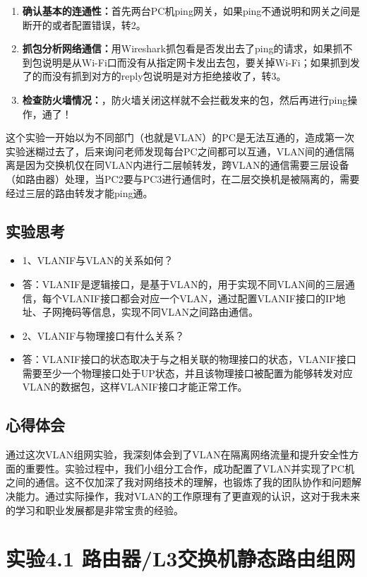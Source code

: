 \documentclass{article}
\begin{document}
\begin{enumerate}
    \item \textbf{确认基本的连通性：}首先两台PC机ping网关，如果ping不通说明和网关之间是断开的或者配置错误，转2。
    \item \textbf{抓包分析网络通信：}用Wireshark抓包看是否发出去了ping的请求，如果抓不到包说明是从Wi-Fi口而没有从指定网卡发出去包，要关掉Wi-Fi；如果抓到发了的而没有抓到对方的reply包说明是对方拒绝接收了，转3。
    \item \textbf{检查防火墙情况：}，防火墙关闭这样就不会拦截发来的包，然后再进行ping操作，通了！
\end{enumerate}

这个实验一开始以为不同部门（也就是VLAN）的PC是无法互通的，造成第一次实验迷糊过去了，后来询问老师发现每台PC之间都可以互通，VLAN间的通信隔离是因为交换机仅在同VLAN内进行二层帧转发，跨VLAN的通信需要三层设备（如路由器）处理，当PC2要与PC3进行通信时，在二层交换机是被隔离的，需要经过三层的路由转发才能ping通。

\subsection{实验思考}
\begin{itemize}
    \item 1、VLANIF与VLAN的关系如何？
    \item 答：VLANIF是逻辑接口，是基于VLAN的，用于实现不同VLAN间的三层通信，每个VLANIF接口都会对应一个VLAN，通过配置VLANIF接口的IP地址、子网掩码等信息，实现不同VLAN之间路由通信。
    \item 2、VLANIF与物理接口有什么关系？
    \item 答：VLANIF接口的状态取决于与之相关联的物理接口的状态，VLANIF接口需要至少一个物理接口处于UP状态，并且该物理接口被配置为能够转发对应VLAN的数据包，这样VLANIF接口才能正常工作。
\end{itemize}

\subsection{心得体会}
通过这次VLAN组网实验，我深刻体会到了VLAN在隔离网络流量和提升安全性方面的重要性。实验过程中，我们小组分工合作，成功配置了VLAN并实现了PC机之间的通信。这不仅加深了我对网络技术的理解，也锻炼了我的团队协作和问题解决能力。通过实际操作，我对VLAN的工作原理有了更直观的认识，这对于我未来的学习和职业发展都是非常宝贵的经验。


\newpage\section{实验4.1 路由器/L3交换机静态路由组网}
\end{document}
